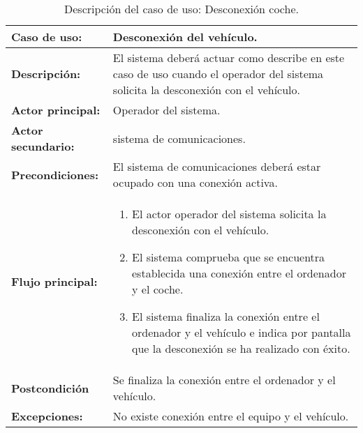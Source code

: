 \begin{table}[H]
  \begin{center}
    \begin{tabular}{|p{3.5cm}|p{10cm}|}
      \hline
      {\textbf{Caso de uso:}} & { Desconexión del vehículo.} \\
      \hline
      {\textbf{Descripción:}} & { El sistema deberá actuar como describe en este caso de uso cuando el operador del sistema solicita la desconexión con el vehículo.} \\
     \hline
      {\textbf{Actor principal:}} & { Operador del sistema.} \\
      \hline
      {\textbf{Actor secundario:}} & { sistema de comunicaciones.} \\
      \hline
      {\textbf{Precondiciones:}} & { El sistema de comunicaciones deberá estar ocupado con una conexión activa.} \\
     \hline   
    {\textbf{Flujo principal:}} & { 
      \begin{enumerate}
\item El actor operador del sistema solicita la desconexión con el vehículo.
\item El sistema comprueba que se encuentra establecida una conexión entre el ordenador y el coche.
\item El sistema finaliza la conexión entre el ordenador y el vehículo e indica por pantalla que la desconexión se ha realizado con éxito.
\end{enumerate}
} \\
     \hline
     {\textbf{Postcondición}} & {Se finaliza la conexión entre el ordenador y el vehículo.}\\
     \hline
         {\textbf{Excepciones:}} & {No existe conexión entre el equipo y el vehículo.}\\
         \hline
    \end{tabular}
  \end{center}
\caption{Descripción del caso de uso: Desconexión coche.}
\end{table}

